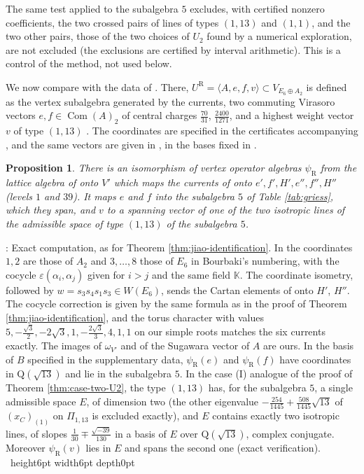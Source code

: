 \documentclass[leqno]{article}
\newcommand{\K}{\ensuremath{\mathbb{K}}}
\newcommand{\Q}{\mathrm{Q}}
\newcommand{\la}{\langle}
\newcommand{\ra}{\rangle}
\newcommand{\qed}{\hfill \vrule height6pt  width6pt depth0pt}
\newcommand{\epsi}{\varepsilon}
\newtheorem{prop}[thm]{Proposition}
\newenvironment{proof}[1][]{\noindent {\it Proof #1} : }{\hbox{~}\qed
\smallskip
}
\numberwithin{equation}{section}
\begin{document}
The same test applied to the subalgebra $5$ excludes, with certified nonzero coefficients, the two crossed pairs of lines of types $(1,13)$ and $(1,1)$, and the two other pairs, those of the two choices of $U_2$ found by a numerical exploration, are not excluded (the exclusions are certified by interval arithmetic). This is a control of the method, not used below.

We now compare with the data of \cite{Rie26}. There, $U^{\mathrm R} = \la A, e, f, v\ra \subset V_{E_6 \oplus A_2}$ is defined as the vertex subalgebra generated by the currents, two commuting Virasoro vectors $e, f \in \operatorname{Com}(A)_2$ of central charges $\frac{70}{31}$, $\frac{2400}{1271}$, and a highest weight vector $v$ of type $(1,13)$ \cite[Section 1]{Rie26b}. The coordinates are specified in the certificates accompanying \cite{Rie26b}, and the same vectors are given in \cite[Section ``The explicit candidate'']{Rie26}, in the bases fixed in \cite{Rie26b}.

\begin{prop}
\label{prop:riesen-identification}
There is an isomorphism of vertex operator algebras $\psi_{\mathrm R}$ from the lattice algebra of \cite{Rie26} onto $V'$ which maps the currents of \cite{Rie26} onto $e', f', H', e'', f'', H''$ (levels $1$ and $39$). It maps $e$ and $f$ into the subalgebra $5$ of Table \ref{tab:griess}, which they span, and $v$ to a spanning vector of one of the two isotropic lines of the admissible space of type $(1,13)$ of the subalgebra $5$.
\end{prop}

\begin{proof}
Exact computation, as for Theorem \ref{thm:jiao-identification}. In \cite{Rie26b} the coordinates $1,2$ are those of $A_2$ and $3,\ldots,8$ those of $E_6$ in Bourbaki's numbering, with the cocycle $\epsi(\alpha_i,\alpha_j)$ given for $i > j$ and the same field $\K$. The coordinate isometry, followed by $w = s_3s_4s_1s_3 \in W(E_6)$, sends the Cartan elements of \cite{Rie26b} onto $H'$, $H''$. The cocycle correction is given by the same formula as in the proof of Theorem \ref{thm:jiao-identification}, and the torus character with values $5, -\frac{\sqrt3}2, -2\sqrt3, 1, -\frac{2\sqrt3}3, 4, 1, 1$ on our simple roots matches the six currents exactly. The images of $\omega_{V'}$ and of the Sugawara vector of $A$ are ours. In the basis of $B$ specified in the supplementary data, $\psi_{\mathrm R}(e)$ and $\psi_{\mathrm R}(f)$ have coordinates in $\Q(\sqrt{13})$ and lie in the subalgebra $5$. In the case (I) analogue of the proof of Theorem \ref{thm:case-two-U2}, the type $(1,13)$ has, for the subalgebra $5$, a single admissible space $E$, of dimension two (the other eigenvalue $-\frac{254}{1445}+\frac{508}{1445}\sqrt{13}$ of $(x_C)_{(1)}$ on $\Pi_{1,13}$ is excluded exactly), and $E$ contains exactly two isotropic lines, of slopes $\frac1{30} \mp \frac{\sqrt{-39}}{130}$ in a basis of $E$ over $\Q(\sqrt{13})$, complex conjugate. Moreover $\psi_{\mathrm R}(v)$ lies in $E$ and spans the second one (exact verification).
\end{proof}
\end{document}
